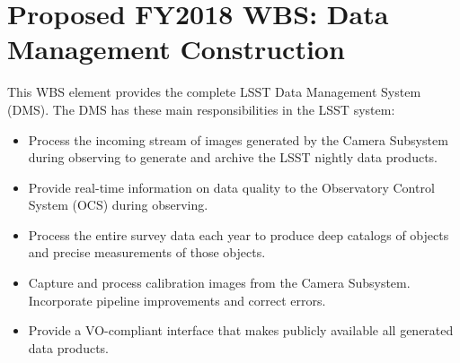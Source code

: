 \section{Proposed FY2018 WBS: Data Management Construction}
\label{sec:wbslist}

This WBS element provides the complete LSST Data Management System (DMS). The
DMS has these main responsibilities in the LSST system:

\begin{itemize}

  \item{Process the incoming stream of images generated by the Camera
  Subsystem during observing to generate and archive the LSST nightly data
  products.}

  \item{Provide real-time information on data quality to the Observatory
  Control System (OCS) during observing.}

  \item{Process the entire survey data each year to produce deep catalogs of
  objects and precise measurements of those objects.}

  \item{Capture and process calibration images from the Camera Subsystem.
  Incorporate pipeline improvements and correct errors.}

  \item{Provide a VO-compliant interface that makes publicly available all
  generated data products.}

\end{itemize}
